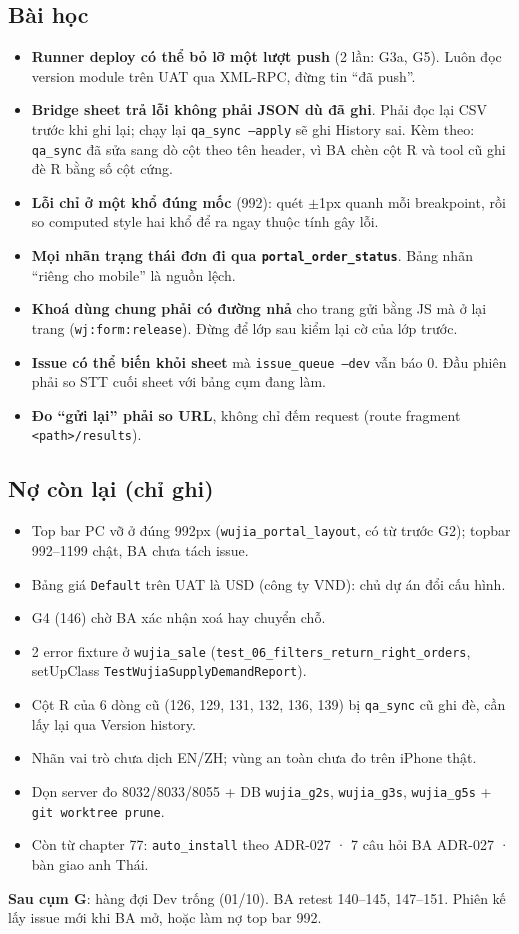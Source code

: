 \subsection*{Bài học}
\begin{itemize}[nosep]
\item \textbf{Runner deploy có thể bỏ lỡ một lượt push} (2 lần: G3a, G5). Luôn đọc version module trên UAT qua XML-RPC,
  đừng tin ``đã push''.
\item \textbf{Bridge sheet trả lỗi không phải JSON dù đã ghi}. Phải đọc lại CSV trước khi ghi lại; chạy lại
  \texttt{qa\_sync --apply} sẽ ghi History sai. Kèm theo: \texttt{qa\_sync} đã sửa sang dò cột theo tên header, vì BA
  chèn cột R và tool cũ ghi đè R bằng số cột cứng.
\item \textbf{Lỗi chỉ ở một khổ đúng mốc} (992): quét $\pm$1px quanh mỗi breakpoint, rồi so computed style hai khổ để ra
  ngay thuộc tính gây lỗi.
\item \textbf{Mọi nhãn trạng thái đơn đi qua \texttt{portal\_order\_status}}. Bảng nhãn ``riêng cho mobile'' là nguồn lệch.
\item \textbf{Khoá dùng chung phải có đường nhả} cho trang gửi bằng JS mà ở lại trang (\texttt{wj:form:release}). Đừng để
  lớp sau kiểm lại cờ của lớp trước.
\item \textbf{Issue có thể biến khỏi sheet} mà \texttt{issue\_queue --dev} vẫn báo 0. Đầu phiên phải so STT cuối sheet với
  bảng cụm đang làm.
\item \textbf{Đo ``gửi lại'' phải so URL}, không chỉ đếm request (route fragment \texttt{<path>/results}).
\end{itemize}

\subsection*{Nợ còn lại (chỉ ghi)}
\begin{itemize}[nosep]
\item Top bar PC vỡ ở đúng 992px (\texttt{wujia\_portal\_layout}, có từ trước G2); topbar 992--1199 chật, BA chưa tách issue.
\item Bảng giá \texttt{Default} trên UAT là USD (công ty VND): chủ dự án đổi cấu hình.
\item G4 (146) chờ BA xác nhận xoá hay chuyển chỗ.
\item 2 error fixture ở \texttt{wujia\_sale} (\texttt{test\_06\_filters\_return\_right\_orders}, setUpClass
  \texttt{TestWujiaSupplyDemandReport}).
\item Cột R của 6 dòng cũ (126, 129, 131, 132, 136, 139) bị \texttt{qa\_sync} cũ ghi đè, cần lấy lại qua Version history.
\item Nhãn vai trò chưa dịch EN/ZH; vùng an toàn chưa đo trên iPhone thật.
\item Dọn server đo 8032/8033/8055 + DB \texttt{wujia\_g2s}, \texttt{wujia\_g3s}, \texttt{wujia\_g5s} + \texttt{git worktree prune}.
\item Còn từ chapter 77: \texttt{auto\_install} theo ADR-027 · 7 câu hỏi BA ADR-027 · bàn giao anh Thái.
\end{itemize}

\textbf{Sau cụm G}: hàng đợi Dev trống (01/10). BA retest 140--145, 147--151. Phiên kế lấy issue mới khi BA mở,
hoặc làm nợ top bar 992.
